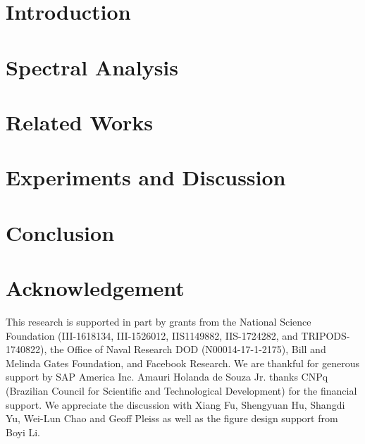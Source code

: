 \documentclass{article}
\begin{document}
\begin{abstract}

\end{abstract}


\section{Introduction}


\section{\Method{}}


\section{Spectral Analysis}



\section{Related Works}


\section{Experiments and Discussion}


\section{Conclusion}



\section*{Acknowledgement}
This research is supported in part by grants from the National
Science Foundation (III-1618134, III-1526012, IIS1149882,
IIS-1724282, and TRIPODS-1740822), the Office
of Naval Research DOD (N00014-17-1-2175), 
Bill and Melinda Gates Foundation, and 
Facebook Research. We are thankful for
generous support by SAP America Inc. 
Amauri Holanda de Souza Jr. thanks CNPq (Brazilian Council for Scientific and Technological Development) for the financial support.
We appreciate the discussion with Xiang Fu, Shengyuan Hu, Shangdi Yu, Wei-Lun Chao and Geoff Pleiss as well as the figure design support from Boyi Li.
\end{document}
